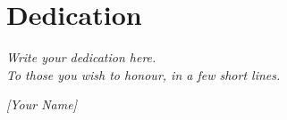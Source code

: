 \chapter*{Dedication}
\thispagestyle{plain}
\vspace*{\fill}
\begin{center}
{\itshape
Write your dedication here.\\[1.5em]

To those you wish to honour, in a few short lines.
\par}

\vspace{2em}
{\large\itshape [Your Name]}
\end{center}
\vspace*{\fill}
\newpage
